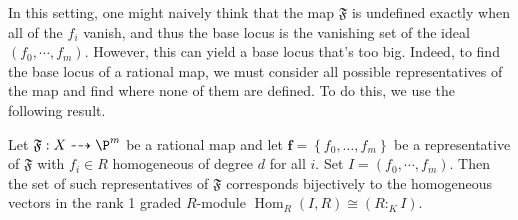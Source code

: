 \documentclass[11pt]{amsart}
\numberwithin{equation}{theorem}
\renewcommand{\:}{\colon}
\DeclareMathOperator{\homgp}{Hom}
\DeclareMathOperator{\Projfnc}{Proj} %
\theoremstyle{theorem}
\begin{document}
In this setting, one might naively think that the map $\mathfrak{F}$ is undefined exactly when all of the $f_i$ vanish, and thus the base locus is the vanishing set of the ideal $(f_0, \cdots, f_m)$. However, this can yield a base locus that's too big.  Indeed, to find the base locus of a rational map, we must consider all possible representatives of the map and find where none of them are defined. To do this, we use the following result.



%

\begin{proposition}\textnormal{\cite[Proposition 1.1]{SimisCremona}}
  Let $\mathfrak{F}: X \dashrightarrow \P^m$ be a rational map and let $\textbf{f} = \left\{ f_0, \dots, f_m \right\}$ be a representative of $\mathfrak{F}$ with $f_i\in R$ homogeneous of degree $d$ for all $i$. Set $I  = (f_0, \cdots, f_m)$. Then the set of such representatives of $\mathfrak{F}$ corresponds bijectively to the homogeneous vectors in the rank 1 graded $R$-module $\homgp_R(I, R) \cong (R :_K I)$.
  \label{lemma:repsOfRatMap}
\end{proposition}
\end{document}
